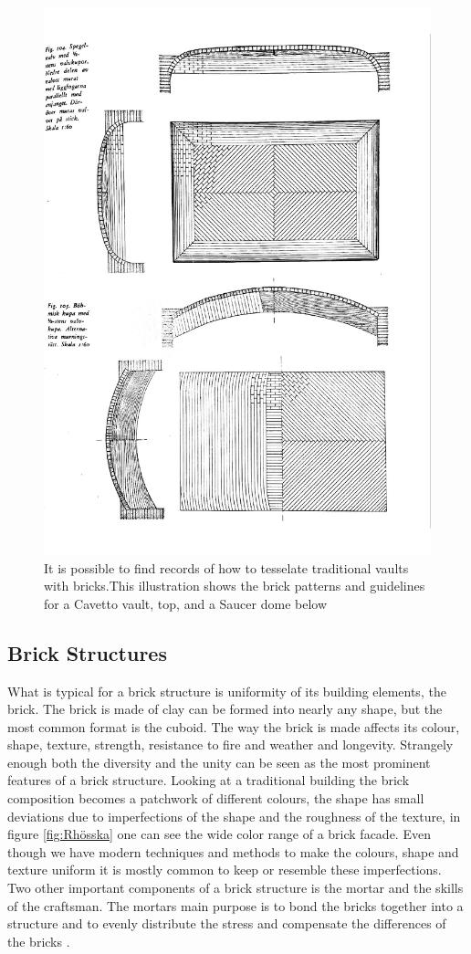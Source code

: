 \begin{figure}[H]
\centering
\includegraphics[height=1.0\linewidth ]{figure/Introduction/vaultin2.pdf}
\caption{It is possible to find records of how to tesselate traditional vaults with bricks.This illustration shows the brick patterns and guidelines for a Cavetto vault, top, and a Saucer dome below \cite{ref:murning}}
\end{figure}


\subsection{Brick Structures}

What is typical for a brick structure is uniformity of its building elements, the brick. The brick is made of clay can be formed into nearly any shape, but the most common format is the cuboid. The way the brick is made affects its colour, shape, texture, strength, resistance to fire and weather and longevity\cite{BrickHistory}. Strangely enough both the diversity and the unity can be seen as the most prominent features of a brick structure. Looking at a traditional building the brick composition becomes a patchwork of different colours, the shape has small deviations due to imperfections of the shape and the roughness of the texture, in figure \ref{fig:Rhösska} one can see the wide color range of a brick facade. Even though we have modern techniques and methods to make the colours, shape and texture uniform it is mostly common to keep or resemble these imperfections.\\
Two other important components of a brick structure is the mortar and the skills of the craftsman. The mortars main purpose is to bond the bricks together into a structure and to evenly distribute the stress and compensate the differences of the bricks \cite{ref:Pfeifer}. 

